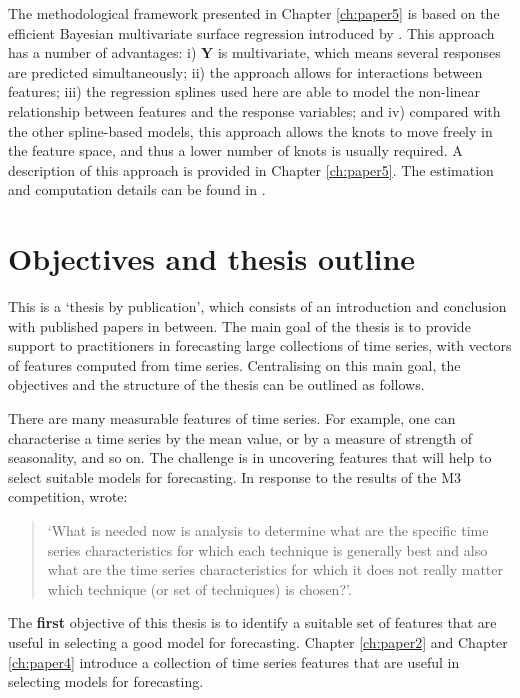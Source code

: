 \documentclass{monashthesis}
\begin{document}
The methodological framework presented in Chapter \ref{ch:paper5} is based on the efficient Bayesian multivariate surface regression introduced by \textcite{li2013efficient}. This approach has a number of advantages: i) \(\textbf{Y}\) is multivariate, which means several responses are predicted simultaneously; ii) the approach allows for interactions between features; iii) the regression splines used here are able to model the non-linear relationship between features and the response variables; and iv) compared with the other spline-based models, this approach allows the knots to move freely in the feature space, and thus a lower number of knots is usually required. A description of this approach is provided in Chapter \ref{ch:paper5}. The estimation and computation details can be found in \textcite{li2013efficient}.

\hypertarget{objectives-and-thesis-outline}{%
\section{Objectives and thesis outline}\label{objectives-and-thesis-outline}}

This is a `thesis by publication', which consists of an introduction and conclusion with published papers in between. The main goal of the thesis is to provide support to practitioners in forecasting large collections of time series, with vectors of features computed from time series. Centralising on this main goal, the objectives and the structure of the thesis can be outlined as follows.

There are many measurable features of time series. For example, one can characterise a time series by the mean value, or by a measure of strength of seasonality, and so on. The challenge is in uncovering features that will help to select suitable models for forecasting. In response to the results of the M3 competition, \textcite{lawrence2001s} wrote:

\begin{quote}
`What is needed now is analysis to determine what are the specific time series characteristics for which each technique is generally best and also what are the time series characteristics for which it does not really matter which technique (or set of techniques) is chosen?'.
\end{quote}

The \textbf{first} objective of this thesis is to identify a suitable set of features that are useful in selecting a good model for forecasting. Chapter \ref{ch:paper2} and Chapter \ref{ch:paper4} introduce a collection of time series features that are useful in selecting models for forecasting.
\end{document}

